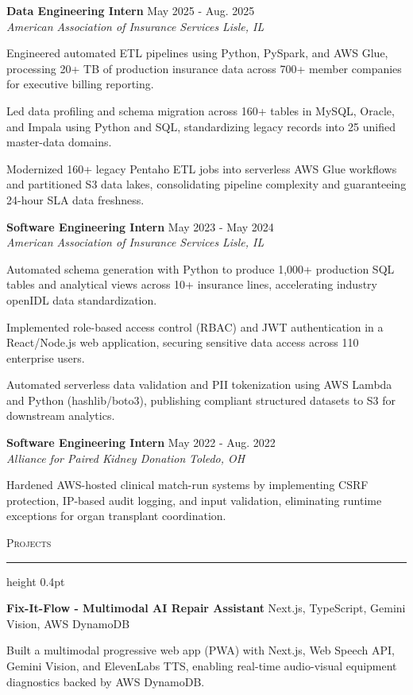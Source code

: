 \documentclass[letterpaper,11pt]{article}
\newcommand{\resumesection}[1]{%
  \par\vspace{2pt}%
  {\large\scshape #1}\par\vspace{2pt}%
  \hrule height 0.4pt\vspace{2pt}%
}
\newcommand{\resumeSubheading}[4]{
  \textbf{#1} \hfill #2\\
  \textit{#3} \hfill \textit{#4}
}
\newcommand{\projectHeading}[2]{
  \textbf{#1} \hfill #2
}
\begin{document}
\resumeSubheading
{Data Engineering Intern}{May 2025 - Aug. 2025}
{American Association of Insurance Services}{Lisle, IL}
\begin{tightitemize}
  \item Engineered automated ETL pipelines using Python, PySpark, and AWS Glue, processing 20+ TB of production insurance data across 700+ member companies for executive billing reporting.
  \item Led data profiling and schema migration across 160+ tables in MySQL, Oracle, and Impala using Python and SQL, standardizing legacy records into 25 unified master-data domains.
  \item Modernized 160+ legacy Pentaho ETL jobs into serverless AWS Glue workflows and partitioned S3 data lakes, consolidating pipeline complexity and guaranteeing 24-hour SLA data freshness.
\end{tightitemize}

\resumeSubheading
{Software Engineering Intern}{May 2023 - May 2024}
{American Association of Insurance Services}{Lisle, IL}
\begin{tightitemize}
  \item Automated schema generation with Python to produce 1,000+ production SQL tables and analytical views across 10+ insurance lines, accelerating industry openIDL data standardization.
  \item Implemented role-based access control (RBAC) and JWT authentication in a React/Node.js web application, securing sensitive data access across 110 enterprise users.
  \item Automated serverless data validation and PII tokenization using AWS Lambda and Python (hashlib/boto3), publishing compliant structured datasets to S3 for downstream analytics.
\end{tightitemize}

\resumeSubheading
{Software Engineering Intern}{May 2022 - Aug. 2022}
{Alliance for Paired Kidney Donation}{Toledo, OH}
\begin{tightitemize}
  \item Hardened AWS-hosted clinical match-run systems by implementing CSRF protection, IP-based audit logging, and input validation, eliminating runtime exceptions for organ transplant coordination.
\end{tightitemize}

\resumesection{Projects}
\projectHeading{Fix-It-Flow - Multimodal AI Repair Assistant}{Next.js, TypeScript, Gemini Vision, AWS DynamoDB}
\begin{tightitemize}
  \item Built a multimodal progressive web app (PWA) with Next.js, Web Speech API, Gemini Vision, and ElevenLabs TTS, enabling real-time audio-visual equipment diagnostics backed by AWS DynamoDB.
\end{tightitemize}
\end{document}
